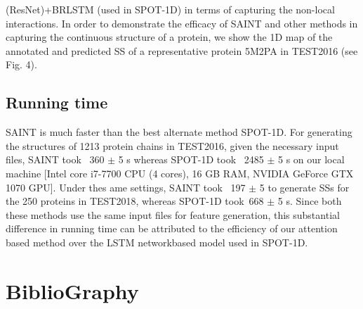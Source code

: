 \documentclass[8pt]{article}
\begin{document}
\begin{multicols}{2}
(ResNet)+BRLSTM (used in SPOT-1D) in terms of capturing the
non-local interactions. In order to demonstrate the efficacy of
SAINT and other methods in capturing the continuous structure of a
protein, we show the 1D map of the annotated and predicted SS of a
representative protein 5M2PA in TEST2016 (see Fig. 4).

\subsection{Running time}
SAINT is much faster than the best alternate method SPOT-1D. For
generating the structures of 1213 protein chains in TEST2016, given
the necessary input files, SAINT took ~360 $\pm $ 5 s whereas SPOT-1D
took ~2485 $\pm $ 5 s on our local machine [Intel core i7-7700 CPU (4
cores), 16 GB RAM, NVIDIA GeForce GTX 1070 GPU]. Under thes ame settings, SAINT took ~197 $\pm $ 5  to generate SSs for the 250
proteins in TEST2018, whereas SPOT-1D took~668 $\pm $ 5  s. Since
both these methods use the same input files for feature generation,
this substantial difference in running time can be attributed to the efficiency of our attention based method over the LSTM networkbased model used in SPOT-1D.

\section{BiblioGraphy}


\end{multicols}
\end{document}
